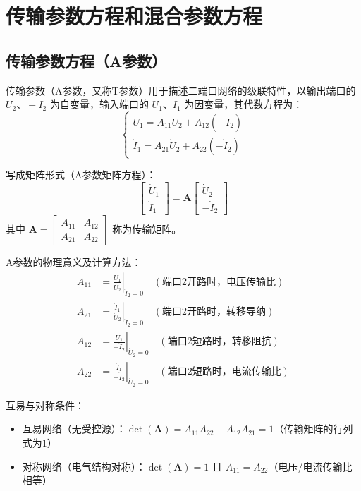\section{传输参数方程和混合参数方程}

\subsection{传输参数方程（A参数）}
传输参数（A参数，又称T参数）用于描述二端口网络的级联特性，以输出端口的 $\dot{U}_2\text{、}-\dot{I}_2$ 为自变量，输入端口的 $\dot{U}_1\text{、}\dot{I}_1$ 为因变量，其代数方程为：
\[
\begin{cases} 
\dot{U}_1 = A_{11}\dot{U}_2 + A_{12}(-\dot{I}_2) \\ 
\dot{I}_1 = A_{21}\dot{U}_2 + A_{22}(-\dot{I}_2) 
\end{cases}
\]

写成矩阵形式（A参数矩阵方程）：
\[
\begin{bmatrix} 
\dot{U}_1 \\ 
\dot{I}_1 
\end{bmatrix} = 
\mathbf{A}
\begin{bmatrix} 
\dot{U}_2 \\ 
-\dot{I}_2 
\end{bmatrix}
\]
其中 $\mathbf{A} = \begin{bmatrix} A_{11} & A_{12} \\ A_{21} & A_{22} \end{bmatrix}$ 称为传输矩阵。

A参数的物理意义及计算方法：
\[
\begin{aligned}
A_{11} &= \left. \frac{\dot{U}_1}{\dot{U}_2} \right|_{\dot{I}_2 = 0} \quad (\text{端口2开路时，电压传输比}) \\
A_{21} &= \left. \frac{\dot{I}_1}{\dot{U}_2} \right|_{\dot{I}_2 = 0} \quad (\text{端口2开路时，转移导纳}) \\
A_{12} &= \left. \frac{\dot{U}_1}{-\dot{I}_2} \right|_{\dot{U}_2 = 0} \quad (\text{端口2短路时，转移阻抗}) \\
A_{22} &= \left. \frac{\dot{I}_1}{-\dot{I}_2} \right|_{\dot{U}_2 = 0} \quad (\text{端口2短路时，电流传输比})
\end{aligned}
\]

互易与对称条件：
\begin{itemize}
    \item 互易网络（无受控源）：$\det(\mathbf{A}) = A_{11}A_{22} - A_{12}A_{21} = 1$（传输矩阵的行列式为1）
    \item 对称网络（电气结构对称）：$\det(\mathbf{A}) = 1$ 且 $A_{11} = A_{22}$（电压/电流传输比相等）
\end{itemize}

